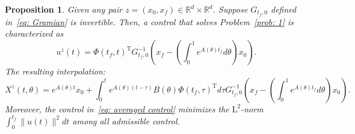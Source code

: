 \documentclass[12pt]{amsart}
\newtheorem{proposition}{Proposition}[section]
\newcommand{\R}{\mathbb{R}}
\renewcommand{\(}{\left (}
\renewcommand{\)}{\right )}
\numberwithin{equation}{section}
\begin{document}
\begin{proposition}\label{prop: Interpolation of determinsstic case}
Given any pair $z=(x_0,x_f)\in\R^d\times\R^d$. Suppose $G_{t_f,0}$ defined in~\eqref{eq: Gramian} is invertible. Then, a control that solves Problem~\ref{prob: 1} is characterized as 
\begin{equation}\label{eq: averaged control}
u^z(t)=\Phi(t_f,t)^{\mathrm{T}} G_{t_f,0}^{-1}\left(x_f-\left(\int_{0}^{1}e^{A(\theta)t_f}d\theta\right) x_0\right).
\end{equation}
The resulting interpolation:
\begin{equation}\label{eq: Ensemble interpolation}
X^z(t,\theta)=e^{A(\theta)t} x_0+\int_{0}^{t}e^{A(\theta)(t-\tau)}B(\theta)\Phi(t_f,\tau)^{\mathrm{T}}d\tau G_{t_f,0}^{-1}\left(x_f-\left(\int_{0}^{1}e^{A(\theta)t_f}d\theta\right) x_0\right).   
\end{equation}
Moreover, the control in~\eqref{eq: averaged control} minimizes the $\mathrm{L}^2$-norm $\int_0^{t_f}\|u(t)\|^2dt$ among all admissible control.
\end{proposition}
\end{document}
